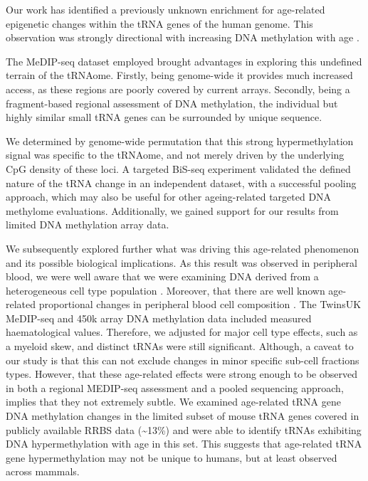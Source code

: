 \documentclass[
]{book}
\begin{document}
Our work has identified a previously unknown enrichment for age-related epigenetic changes within the tRNA genes of the human genome.
This observation was strongly directional with increasing DNA methylation with age \citep{Ehrlich2019}.

The MeDIP-seq dataset employed brought advantages in exploring this undefined terrain of the tRNAome.
Firstly, being genome-wide it provides much increased access, as these regions are poorly covered by current arrays.
Secondly, being a fragment-based regional assessment of DNA methylation, the individual but highly similar small tRNA genes can be surrounded by unique sequence.

We determined by genome-wide permutation that this strong hypermethylation signal was specific to the tRNAome, and not merely driven by the underlying CpG density of these loci.
A targeted BiS-seq experiment validated the defined nature of the tRNA change in an independent dataset, with a successful pooling approach, which may also be useful for other ageing-related targeted DNA methylome evaluations.
Additionally, we gained support for our results from limited DNA methylation array data.

We subsequently explored further what was driving this age-related phenomenon and its possible biological implications.
As this result was observed in peripheral blood, we were well aware that we were examining DNA derived from a heterogeneous cell type population \citep{Lappalainen2017a}.
Moreover, that there are well known age-related proportional changes in peripheral blood cell composition \citep{Geiger2013}.
The TwinsUK MeDIP-seq and 450k array DNA methylation data included measured haematological values.
Therefore, we adjusted for major cell type effects, such as a myeloid skew, and distinct tRNAs were still significant.
Although, a caveat to our study is that this can not exclude changes in minor specific sub-cell fractions types.
However, that these age-related effects were strong enough to be observed in both a regional MEDIP-seq assessment and a pooled sequencing approach, implies that they not extremely subtle.
We examined age-related tRNA gene DNA methylation changes in the limited subset of mouse tRNA genes covered in publicly available RRBS data (\textasciitilde13\%) and were able to identify tRNAs exhibiting DNA hypermethylation with age in this set.
This suggests that age-related tRNA gene hypermethylation may not be unique to humans, but at least observed across mammals.
\end{document}

